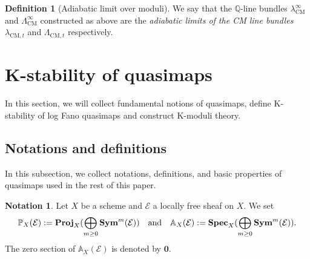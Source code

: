 \documentclass[12pt,twoside]{amsart}
\theoremstyle{definition}
\newtheorem{defn}[thm]{Definition}
\newtheorem{note}[thm]{Notation}
\begin{document}
\begin{defn}[Adiabatic limit over moduli]
    We say that the $\mathbb{Q}$-line bundles $\lambda^\infty_{\mathrm{CM}}$ and  $\Lambda^\infty_{\mathrm{CM}}$ constructed as above are the {\it adiabatic limits of the CM line bundles} $\lambda_{\mathrm{CM},t}$ and $\Lambda_{\mathrm{CM},t}$ respectively.
\end{defn}





\section{K-stability of quasimaps}\label{sec3}

In this section, we will collect fundamental notions of quasimaps, define K-stability of log Fano quasimaps and construct K-moduli theory.

\subsection{Notations and definitions}

In this subsection, we collect notations, definitions, and basic properties of quasimaps used in the rest of this paper. 

\begin{note}
    Let $X$ be a scheme and $\mathcal{E}$ a locally free sheaf on $X$.
    We set 
    $$\mathbb{P}_X(\mathcal{E}):=\mathbf{Proj}_X(\bigoplus_{m\ge0}\mathbf{Sym}^m(\mathcal{E})) \quad {\rm and} \quad \mathbb{A}_X(\mathcal{E}):=\mathbf{Spec}_X(\bigoplus_{m\ge0}\mathbf{Sym}^m(\mathcal{E})).$$ 
    The zero section of $\mathbb{A}_X(\mathcal{E})$ is denoted by $\mathbf{0}$.
\end{note}
\end{document}
